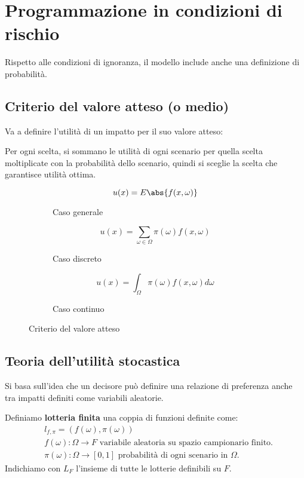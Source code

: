 \documentclass[\main/main.tex]{subfiles}
\begin{document}
\chapter{Programmazione in condizioni di rischio}
Rispetto alle condizioni di ignoranza, il modello include anche una definizione di probabilità.

\section{Criterio del valore atteso (o medio)}
Va a definire l'utilità di un impatto per il suo valore atteso:

Per ogni scelta, si sommano le utilità di ogni scenario per quella scelta moltiplicate con la probabilità dello scenario, quindi si sceglie la scelta che garantisce utilità ottima.

\begin{figure}
  \begin{subfigure}{0.31\textwidth}
    \[
      u(x) = E\abs{f(x,\omega)}
    \]
    \caption{Caso generale}
  \end{subfigure}
  \begin{subfigure}{0.31\textwidth}
    \[
      u(x) = \sum_{\omega \in \Omega} \pi(\omega) f(x, \omega)
    \]
    \caption{Caso discreto}
  \end{subfigure}
  \begin{subfigure}{0.31\textwidth}
    \[
      u(x) = \int_{\Omega} \pi(\omega) f(x, \omega) d\omega
    \]
    \caption{Caso continuo}
  \end{subfigure}
  \caption{Criterio del valore atteso}
\end{figure}

\section{Teoria dell'utilità stocastica}
Si basa sull'idea che un decisore può definire una relazione di preferenza anche tra impatti definiti come variabili aleatorie.

\begin{definition}[Lotteria]
  Definiamo \textbf{lotteria finita} una coppia di funzioni definite come:
  \begin{align*}
     & l_{f, \pi} = (f(\omega), \pi(\omega))                                                     \\
     & f(\omega): \Omega \rightarrow F \text{ variabile aleatoria su spazio campionario finito.} \\
     & \pi(\omega): \Omega \rightarrow [0,1] \text{ probabilità di ogni scenario in $\Omega$.}
  \end{align*}
  Indichiamo con $L_F$ l'insieme di tutte le lotterie definibili su $F$.
\end{definition}
\end{document}
